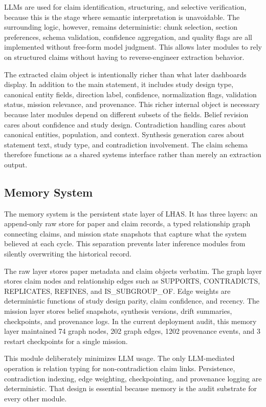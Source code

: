 \documentclass[manuscript,screen,review]{jair}
\begin{document}
LLMs are used for claim identification, structuring, and selective verification, because this is the stage where semantic interpretation is unavoidable. The surrounding logic, however, remains deterministic: chunk selection, section preferences, schema validation, confidence aggregation, and quality flags are all implemented without free-form model judgment. This allows later modules to rely on structured claims without having to reverse-engineer extraction behavior.

The extracted claim object is intentionally richer than what later dashboards display. In addition to the main statement, it includes study design type, canonical entity fields, direction label, confidence, normalization flags, validation status, mission relevance, and provenance. This richer internal object is necessary because later modules depend on different subsets of the fields. Belief revision cares about confidence and study design. Contradiction handling cares about canonical entities, population, and context. Synthesis generation cares about statement text, study type, and contradiction involvement. The claim schema therefore functions as a shared systems interface rather than merely an extraction output.

\subsection{Memory System}
The memory system is the persistent state layer of LHAS. It has three layers: an append-only raw store for paper and claim records, a typed relationship graph connecting claims, and mission state snapshots that capture what the system believed at each cycle. This separation prevents later inference modules from silently overwriting the historical record.

The raw layer stores paper metadata and claim objects verbatim. The graph layer stores claim nodes and relationship edges such as SUPPORTS, CONTRADICTS, REPLICATES, REFINES, and IS\_SUBGROUP\_OF. Edge weights are deterministic functions of study design parity, claim confidence, and recency. The mission layer stores belief snapshots, synthesis versions, drift summaries, checkpoints, and provenance logs. In the current deployment audit, this memory layer maintained 74 graph nodes, 202 graph edges, 1202 provenance events, and 3 restart checkpoints for a single mission.

This module deliberately minimizes LLM usage. The only LLM-mediated operation is relation typing for non-contradiction claim links. Persistence, contradiction indexing, edge weighting, checkpointing, and provenance logging are deterministic. That design is essential because memory is the audit substrate for every other module.
\end{document}
